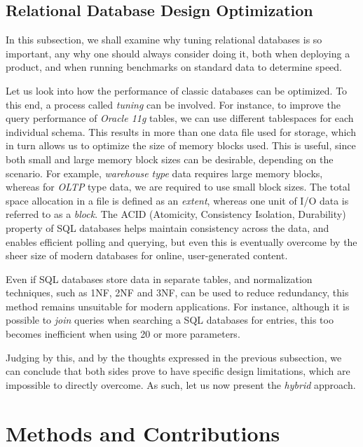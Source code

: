\documentclass[10pt,        %
               a4paper,     %
               journal,     %
               ]{IEEEtran}
\begin{document}
\subsection{Relational Database Design Optimization}
In this subsection, we shall examine why tuning relational databases is so important, any why one should always consider doing it, both when deploying a product, and when running benchmarks on standard data to determine speed. \par
Let us look into how the performance of classic databases can be optimized. To this end, a process called \textit{tuning} can be involved. For instance, to improve the query performance of \textit{Oracle 11g} tables, we can use different tablespaces for each individual schema.  This results in more than one data file used for storage, which in turn allows us to optimize the size of memory blocks used. This is useful, since both small and large memory block sizes can be desirable, depending on the scenario. For example, \textit{warehouse type} data requires large memory blocks, whereas for \textit{OLTP} type data, we are required to use small block sizes. The total space allocation in a file is defined as an \textit{extent}, whereas one unit of I/O data is referred to as a \textit{block}. 
The ACID (Atomicity, Consistency Isolation, Durability) property of SQL databases helps maintain consistency across the data, and enables efficient polling and querying, but even this is eventually overcome by the sheer size of modern databases for online, user-generated content. \par
Even if SQL databases store data in separate tables, and normalization techniques, such as 1NF, 2NF and 3NF, can be used to reduce redundancy, this method remains unsuitable for modern applications. For instance, although it is possible to \textit{join} queries when searching a SQL databases for entries, this too becomes inefficient when using 20 or more parameters. \par
Judging by this, and by the thoughts expressed in the previous subsection, we can conclude that both sides prove to have specific design limitations, which are impossible to directly overcome. As such, let us now present the \textit{hybrid} approach. 

\section{Methods and Contributions}
\end{document}
